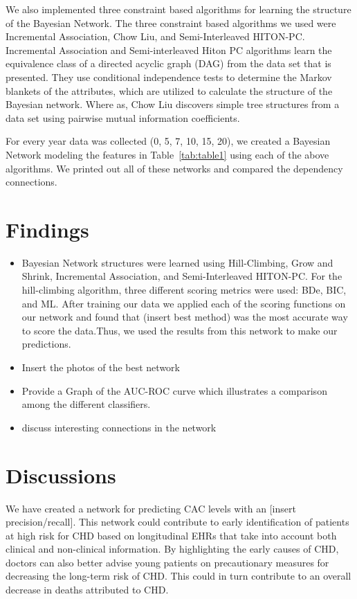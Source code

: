 \documentclass[letterpaper]{article}
\begin{document}
 
We also implemented three constraint based algorithms for learning the structure of the Bayesian Network.  The three constraint based algorithms we used were Incremental Association, Chow Liu, and Semi-Interleaved HITON-PC. Incremental Association and Semi-interleaved Hiton PC algorithms learn the equivalence class of a directed acyclic graph (DAG) from the data set that is presented.\cite{scutari2017package}  They use conditional independence tests to determine the Markov blankets of the attributes, which are utilized to calculate the structure of the Bayesian network. \cite{scutari2017package}  Where as, Chow Liu discovers simple tree structures from a data set using pairwise mutual information coefficients.\cite{scutari2017package}  

For every year data was collected (0, 5, 7, 10, 15, 20), we created a Bayesian Network modeling the features in Table~\ref{tab:table1} using each of the above algorithms. We printed out all of these networks and compared the dependency connections. 

\section{Findings}
\begin{itemize}
    \item Bayesian Network structures were learned using Hill-Climbing, Grow and Shrink, Incremental Association, and Semi-Interleaved HITON-PC. For the hill-climbing algorithm, three different scoring metrics were used: BDe, BIC, and ML. After training our data we applied each of the scoring functions on our network and found that (insert best method) was the most accurate way to score the data.Thus, we used the results from this network to make our predictions. 
    \item Insert the photos of the best network 
    \item Provide a Graph of the AUC-ROC curve which illustrates a comparison among the different classifiers.
    \item discuss interesting connections in the network
\end{itemize}

\section{Discussions}
We have created a network for predicting CAC levels with an [insert precision/recall]. This network could contribute to early identification of patients at high risk for CHD based on longitudinal EHRs that take into account both clinical and non-clinical information. By highlighting the early causes of CHD, doctors can also better advise young patients on precautionary measures for decreasing the long-term risk of CHD. This could in turn contribute to an overall decrease in deaths attributed to CHD.
\end{document}

